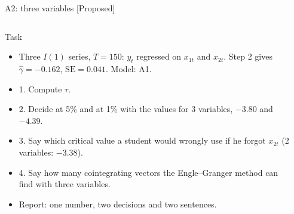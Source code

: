 \begin{frame}{A2: three variables [Proposed]}
\propsub
\itemsize{\scriptsize}
\begin{columns}[T]
\begin{column}{\taskw}
\begin{block}{Task}
\begin{itemize}
    \item Three $I(1)$ series, $T = 150$: $y_t$ regressed on $x_{1t}$ and $x_{2t}$. Step 2 gives $\hat\gamma = -0.162$, $\mathrm{SE} = 0.041$. Model: A1.
    \item 1. Compute $\tau$.
    \item 2. Decide at 5\% and at 1\% with the values for 3 variables, $-3.80$ and $-4.39$.
    \item 3. Say which critical value a student would wrongly use if he forgot $x_{2t}$ (2 variables: $-3.38$).
    \item 4. Say how many cointegrating vectors the Engle--Granger method can find with three variables.
    \item Report: one number, two decisions and two sentences.
\end{itemize}
\end{block}
\end{column}
\begin{column}{\solw}
\end{column}
\end{columns}
\end{frame}

